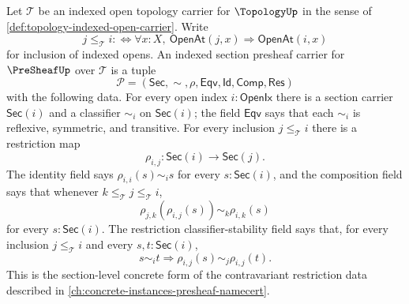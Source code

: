 \begin{definition}
\label{def:sheaf-indexed-section-presheaf-carrier}
Let $\mathcal{T}$ be an indexed open topology carrier for $\TopologyUp$ in the sense of \autoref{def:topology-indexed-open-carrier}. Write
$$
j\le_{\mathcal{T}} i
:\Longleftrightarrow
\forall x:X,\ \mathsf{OpenAt}(j,x)\Longrightarrow\mathsf{OpenAt}(i,x)
$$
for inclusion of indexed opens. An indexed section presheaf carrier for $\PreSheafUp$ over $\mathcal{T}$ is a tuple
$$
\mathcal{P}=(\mathsf{Sec},\sim,\rho,\mathsf{Eqv},\mathsf{Id},\mathsf{Comp},\mathsf{Res})
$$
with the following data. For every open index $i:\mathsf{OpenIx}$ there is a section carrier $\mathsf{Sec}(i)$ and a classifier $\sim_i$ on $\mathsf{Sec}(i)$; the field $\mathsf{Eqv}$ says that each $\sim_i$ is reflexive, symmetric, and transitive. For every inclusion $j\le_{\mathcal{T}} i$ there is a restriction map
$$
\rho_{i,j}:\mathsf{Sec}(i)\to\mathsf{Sec}(j).
$$
The identity field says $\rho_{i,i}(s)\sim_i s$ for every $s:\mathsf{Sec}(i)$, and the composition field says that whenever $k\le_{\mathcal{T}}j\le_{\mathcal{T}}i$,
$$
\rho_{j,k}(\rho_{i,j}(s))\sim_k\rho_{i,k}(s)
$$
for every $s:\mathsf{Sec}(i)$. The restriction classifier-stability field says that, for every inclusion $j\le_{\mathcal{T}}i$ and every $s,t:\mathsf{Sec}(i)$,
$$
s\sim_i t
\Longrightarrow
\rho_{i,j}(s)\sim_j\rho_{i,j}(t).
$$
This is the section-level concrete form of the contravariant restriction data described in \autoref{ch:concrete-instances-presheaf-namecert}.
\end{definition}

